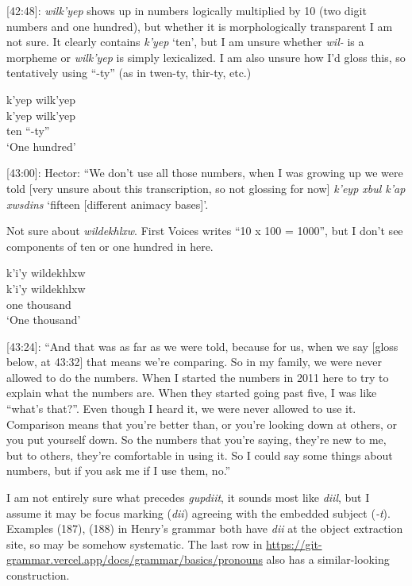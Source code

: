 \documentclass{article}
\begin{document}
[42:48]: \textit{wilk'yep} shows up in numbers logically multiplied by 10 (two digit numbers and one hundred), but whether it is morphologically transparent I am not sure. It clearly contains \textit{k'yep} `ten', but I am unsure whether \textit{wil-} is a morpheme or \textit{wilk'yep} is simply lexicalized. I am also unsure how I'd gloss this, so tentatively using ``-ty'' (as in twen-ty, thir-ty, etc.)

\begin{exe}
    \ex \glll k'yep wilk'yep \\
    k'yep wilk'yep \\
    ten ``-ty''\\
    `One hundred'
\end{exe}

[43:00]: Hector: ``We don't use all those numbers, when I was growing up we were told [very unsure about this transcription, so not glossing for now] \textit{k'eyp xbul k'ap xwsdins} `fifteen [different animacy bases]'.

Not sure about \textit{wildekhlxw}. First Voices writes ``10 x 100 = 1000'', but I don't see components of ten or one hundred in here.

\begin{exe}
    \ex \glll k'i'y wildekhlxw \\
    k'i'y wildekhlxw \\
    one thousand\\
    `One thousand'
\end{exe}

[43:24]: ``And that was as far as we were told, because for us, when we say [gloss below, at 43:32] that means we're comparing. So in my family, we were never allowed to do the numbers. When I started the numbers in 2011 here to try to explain what the numbers are. When they started going past five, I was like ``what's that?''. Even though I heard it, we were never allowed to use it. Comparison means that you're better than, or you're looking down at others, or you put yourself down. So the numbers that you're saying, they're new to me, but to others, they're comfortable in using it. So I could say some things about numbers, but if you ask me if I use them, no.''

I am not entirely sure what precedes \textit{gupdiit}, it sounds most like \textit{diil}, but I assume it may be focus marking (\textit{dii}) agreeing with the embedded subject (\textit{-t}). Examples (187), (188) in Henry's grammar both have \textit{dii} at the object extraction site, so may be somehow systematic. The last row in \url{https://git-grammar.vercel.app/docs/grammar/basics/pronouns} also has a similar-looking construction.
\end{document}
